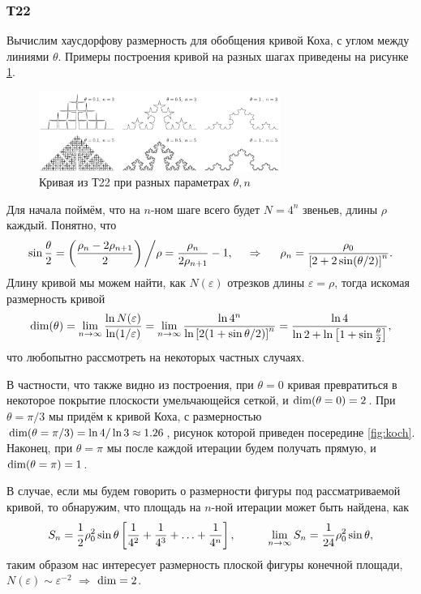 
\subsubsection*{Т22}

Вычислим хаусдорфову размерность для обобщения кривой Коха, с углом между линиями $\theta$. Примеры построения кривой на разных шагах приведены на рисунке \ref{fig:koch}.
\begin{figure}[ht]
    \centering
    \includegraphics[width=0.7\textwidth]{figures/koch_line.pdf}
    \caption{Кривая из Т22 при разных параметрах $\theta, n$}
    \label{fig:koch}
\end{figure}
Для начала поймём, что на $n$-ном шаге всего будет $N = 4^n$ звеньев, длины $\rho$ каждый. Понятно, что
\begin{equation*}
    \sin \frac{\theta}{2} = \left(\frac{\rho_n - 2 \rho_{n+1}}{2}\right) \bigg/ \rho = \frac{\rho_n}{2 \rho_{n+1}} - 1,
    \hspace{0.5cm} \Rightarrow \hspace{0.5cm}
    \rho_n = \frac{\rho_0}{\left[
        2 +2 \sin(\theta/2)
    \right]^n}.
\end{equation*}
Длину кривой мы можем найти, как $N(\varepsilon)$ отрезков длины $\varepsilon = \rho$, тогда искомая размерность кривой
\begin{equation*}
    \textnormal{dim}(\theta) = \lim_{n \to \infty} \frac{
    \ln N(\varepsilon)
    }{
    \ln(1/\varepsilon)
    } = \lim_{n \to \infty} 
    \frac{\ln 4^n}{\ln\left[2(1+\sin \theta/2)\right]^n} = \frac{\ln 4}{\ln 2 + \ln \left[1+\sin \frac{\theta}{2}\right]},
\end{equation*}
что любопытно рассмотреть на некоторых частных случаях. 

В частности, что также видно из построения, при $\theta = 0$ кривая превратиться в некоторое покрытие плоскости умельчающейся сеткой, и $\textnormal{dim}(\theta=0) = 2$.
При $\theta = \pi/3$ мы придём к кривой Коха, с размерностью $\textnormal{dim}(\theta= \pi/3) = \ln 4/ \ln 3 \approx 1.26$, рисунок которой приведен посередине \eqref{fig:koch}. 
Наконец, при $\theta = \pi$ мы после каждой итерации будем получать прямую, и $\textnormal{dim}(\theta= \pi) = 1$. 

В случае, если мы будем говорить о размерности фигуры под рассматриваемой кривой, то обнаружим, что площадь на $n$-ной итерации может быть найдена, как
\begin{equation*}
    S_n = \frac{1}{2} \rho_0^2 \sin \theta \left[
        \frac{1}{4^2} + \frac{1}{4^3} + \ldots + \frac{1}{4^{n}}
    \right],
    \hspace{10 mm} 
    \lim_{n \to \infty} S_n = \frac{1}{24} \rho_0^2 \sin \theta,
\end{equation*}
таким образом нас интересует размерность плоской фигуры конечной площади, $N(\varepsilon) \sim \varepsilon^{-2}$ $\Rightarrow$ $\textnormal{dim} = 2$.